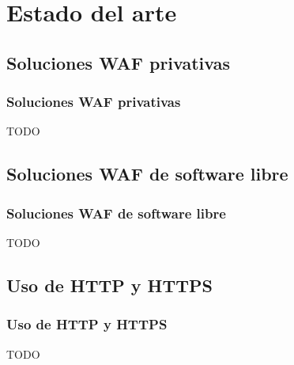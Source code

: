\section{Estado del arte}


\subsection{Soluciones WAF privativas}
\begin{frame}[shrink]
  \frametitle{Soluciones WAF privativas}
  TODO
\end{frame}

\subsection{Soluciones WAF de software libre}
\begin{frame}[shrink]
  \frametitle{Soluciones WAF de software libre}
  TODO
\end{frame}

\subsection{Uso de HTTP y HTTPS}
\begin{frame}[shrink]
  \frametitle{Uso de HTTP y HTTPS}
  TODO
\end{frame}

